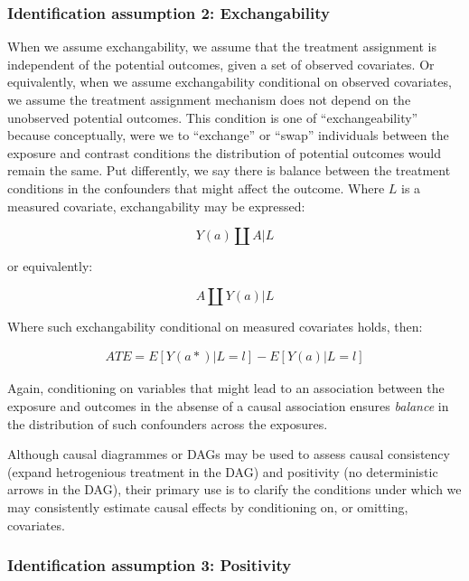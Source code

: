 \documentclass[
  singlecolumn]{report}
\begin{document}
\hypertarget{identification-assumption-2-exchangability}{%
\subsubsection{Identification assumption 2:
Exchangability}\label{identification-assumption-2-exchangability}}

When we assume exchangability, we assume that the treatment assignment
is independent of the potential outcomes, given a set of observed
covariates. Or equivalently, when we assume exchangability conditional
on observed covariates, we assume the treatment assignment mechanism
does not depend on the unobserved potential outcomes. This condition is
one of ``exchangeability'' because conceptually, were we to ``exchange''
or ``swap'' individuals between the exposure and contrast conditions the
distribution of potential outcomes would remain the same. Put
differently, we say there is balance between the treatment conditions in
the confounders that might affect the outcome. Where \(L\) is a measured
covariate, exchangability may be expressed:

\[Y(a)\coprod  A|L\]

or equivalently:

\[A \coprod  Y(a)|L\]

Where such exchangability conditional on measured covariates holds,
then:

\[
\begin{aligned}
ATE = E[Y(a*)|L = l] - E[Y(a)|L = l] 
\end{aligned}
\]

Again, conditioning on variables that might lead to an association
between the exposure and outcomes in the absense of a causal association
ensures \emph{balance} in the distribution of such confounders across
the exposures.

Although causal diagrammes or DAGs may be used to assess causal
consistency (expand hetrogenious treatment in the DAG) and positivity
(no deterministic arrows in the DAG), their primary use is to clarify
the conditions under which we may consistently estimate causal effects
by conditioning on, or omitting, covariates.

\hypertarget{identification-assumption-3-positivity}{%
\subsubsection{Identification assumption 3:
Positivity}\label{identification-assumption-3-positivity}}
\end{document}
